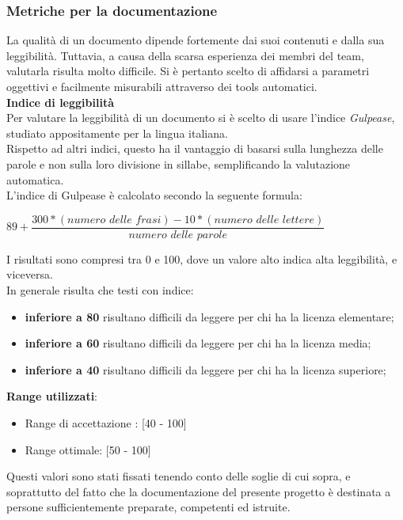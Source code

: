\subsubsection{Metriche per la documentazione}\label{MetricheDoc}
\hypertarget{metriche_documenti}{}
La qualità di un documento dipende fortemente dai suoi contenuti e dalla sua leggibilità. Tuttavia, a causa della scarsa esperienza dei membri del team, valutarla risulta molto difficile. Si è pertanto scelto di affidarsi a parametri oggettivi e facilmente misurabili attraverso dei tools automatici.\\

\textbf{Indice di leggibilità}\\

Per valutare la leggibilità di un documento si è scelto di usare l'indice \textit{Gulpease}, studiato appositamente per la lingua italiana.\\
Rispetto ad altri indici, questo ha il vantaggio di basarsi sulla lunghezza delle parole e non sulla loro divisione in sillabe, semplificando la valutazione automatica.\\
L'indice di Gulpease è calcolato secondo la seguente formula:
\begin{center}
\begin{math}
	89 + 
		\dfrac	{300 * (\textit{numero delle frasi}) - 10 * (\textit{numero delle lettere})}
				{\textit{numero delle parole}}
\end{math}
\end{center}
I risultati sono compresi tra 0 e 100, dove un valore alto indica alta leggibilità, e viceversa. \\
In generale risulta che testi con indice:
\begin{itemize}
	\item \textbf{inferiore a 80} risultano difficili da leggere per chi ha la licenza elementare;
	\item \textbf{inferiore a 60} risultano difficili da leggere per chi ha la licenza media;
	\item \textbf{inferiore a 40} risultano difficili da leggere per chi ha la licenza superiore;
\end{itemize}
\textbf{Range utilizzati}:
\begin{itemize}
	\item Range di accettazione : [40 - 100]
	\item Range ottimale: [50 - 100]
\end{itemize}
Questi valori sono stati fissati tenendo conto delle soglie di cui sopra, e soprattutto del fatto che la documentazione del presente progetto è destinata a persone sufficientemente preparate, competenti ed istruite.

